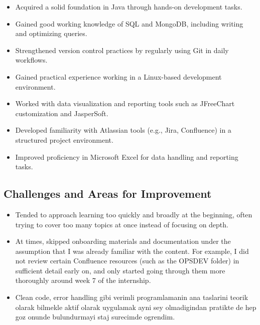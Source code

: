 \begin{itemize}
    \item Acquired a solid foundation in Java through hands-on development tasks.
    \item Gained good working knowledge of SQL and MongoDB, including writing and optimizing queries.
    \item Strengthened version control practices by regularly using Git in daily workflows.
    \item Gained practical experience working in a Linux-based development environment.
    \item Worked with data visualization and reporting tools such as JFreeChart customization and JasperSoft.
    \item Developed familiarity with Atlassian tools (e.g., Jira, Confluence) in a structured project environment.
    \item Improved proficiency in Microsoft Excel for data handling and reporting tasks.
\end{itemize}

\subsection{Challenges and Areas for Improvement}
\begin{itemize}
    \item Tended to approach learning too quickly and broadly at the beginning, often trying to cover too many topics at once instead of focusing on depth.
    \item At times, skipped onboarding materials and documentation under the assumption that I was already familiar with the content. For example, I did not review certain Confluence resources (such as the OPSDEV folder) in sufficient detail early on, and only started going through them more thoroughly around week 7 of the internship.
    \item Clean code, error handling gibi verimli programlamanin ana taslarini teorik olarak bilmekle aktif olarak uygulamak ayni sey olmadigindan pratikte de hep goz onunde bulundurmayi staj surecimde ogrendim.   
\end{itemize}


